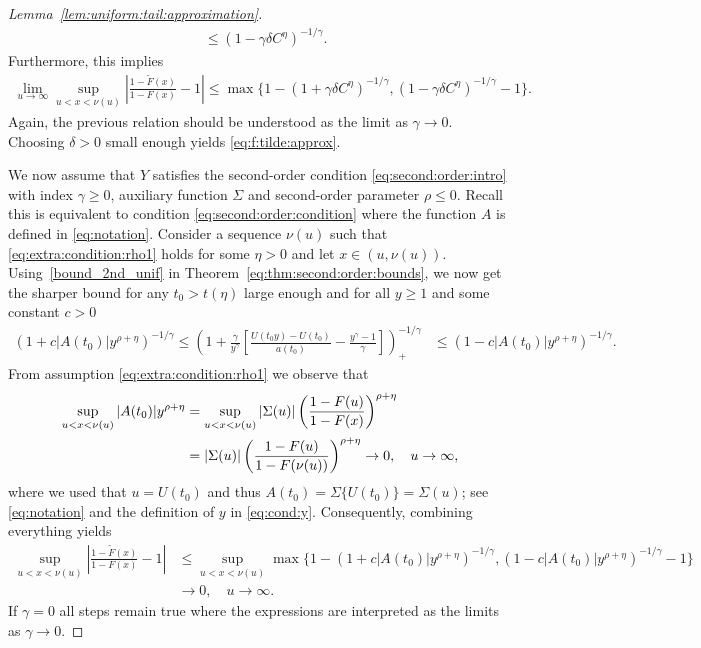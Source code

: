 \documentclass{statsoc}
\theoremstyle{break}
\newcommand{\tzero}{t_0}
\begin{document}
\begin{proof}[Lemma~\ref{lem:uniform:tail:approximation}]
\begin{align*}
 		&\leq 
 		(1 - \gamma \delta C^{\eta} )^{-1/\gamma}.
 	\end{align*} 
 		Furthermore, this implies
 	\begin{align*}
 		\lim_{u \to \infty} \sup_{ u< x < \nu(u)} \left| \frac{1 - \tilde F(x) }{1-F(x)}  - 1 \right| \leq \max\{ 1- (1 + \gamma \delta C^{\eta} )^{-1/\gamma}, (1 - \gamma \delta C^{\eta} )^{-1/\gamma} - 1\} .
 	\end{align*}		
 		Again, the previous relation should be understood as the limit as $\gamma \to 0$. Choosing $\delta >0$ small enough yields \eqref{eq:f:tilde:approx}.

		
		We now assume that $Y$ satisfies the second-order condition \eqref{eq:second:order:intro} with index $\gamma \geq 0$, auxiliary function $\Sigma$ and second-order parameter $\rho \leq 0$. Recall this is equivalent to condition  \eqref{eq:second:order:condition} where the function $A$ is defined in \eqref{eq:notation}. 
Consider a sequence $\nu(u)$ such that \eqref{eq:extra:condition:rho1} holds for some $\eta>0$ and let $x\in(u,\nu(u))$. Using~\eqref{bound_2nd_unif} in Theorem~\ref{eq:thm:second:order:bounds}, we now get the sharper bound for any $\tzero > t(\eta)$ large enough and for all $y \geq 1$ and some constant $c>0$ 
 	\begin{align*}
 		(1 + c |A(\tzero)| y^{\rho+\eta})^{-1/\gamma} 	\leq \left(  1 + \frac{\gamma}{y^\gamma} \left[  \frac{ U(\tzero y) - U(\tzero)} { a(\tzero) } - \frac{y^\gamma - 1}{\gamma} \right] \right)_+^{-1/\gamma}
 		&\leq 
 		(1 -  c |A(\tzero)| y^{\rho+\eta} )^{-1/\gamma}.
 	\end{align*} 
	From assumption \eqref{eq:extra:condition:rho1} we observe that
	\begin{align}
		\notag \sup_{ u< x < \nu(u)}  |A(t_0)|y^{\rho + \eta} &= \sup_{ u< x < \nu(u)} |\Sigma(u)|\left( \frac{1-F(u)}{1-F(x )} \right)^{\rho + \eta} \\
		\label{Sigma_bound} &=  |\Sigma(u)|\left( \frac{1-F(u)}{1-F(\nu(u))} \right)^{\rho + \eta} \to 0, \quad u\to\infty,
	\end{align}
	where we used that $u = U(t_0)$ and thus $A(t_0) = \Sigma\{U(t_0)\} = \Sigma(u)$; see \eqref{eq:notation} and the definition of $y$  in \eqref{eq:cond:y}. Consequently, combining everything yields
	\begin{align*}
		\sup_{ u< x < \nu(u)} \left| \frac{1 - \tilde F(x) }{1-F(x)}  - 1 \right| &\leq \sup_{ u< x < \nu(u)} \max\{ 1- (1 +  c |A(\tzero)| y^{\rho+\eta} )^{-1/\gamma}, (1 -  c |A(\tzero)| y^{\rho+\eta} )^{-1/\gamma} - 1\}\\
		& \to 0, \quad u\to\infty.
	\end{align*}	
	If $\gamma = 0$ all steps remain true where the expressions are interpreted as the limits as $\gamma \to 0$.



\end{proof}
\end{document}
